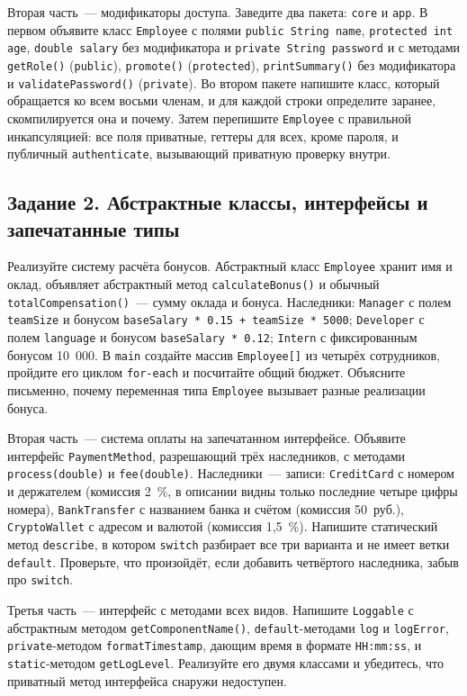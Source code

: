 Вторая часть~--- модификаторы доступа. Заведите два пакета: \texttt{core} и
\texttt{app}. В первом объявите класс \texttt{Employee} с полями
\texttt{public String name}, \texttt{protected int age},
\texttt{double salary} без модификатора и \texttt{private String password} и с
методами \texttt{getRole()} (\texttt{public}), \texttt{promote()}
(\texttt{protected}), \texttt{printSummary()} без модификатора и
\texttt{validatePassword()} (\texttt{private}). Во втором пакете напишите
класс, который обращается ко всем восьми членам, и для каждой строки
определите заранее, скомпилируется она и почему. Затем перепишите
\texttt{Employee} с правильной инкапсуляцией: все поля приватные, геттеры для
всех, кроме пароля, и публичный \texttt{authenticate}, вызывающий приватную
проверку внутри.

\subsection*{Задание 2. Абстрактные классы, интерфейсы и запечатанные типы}

Реализуйте систему расчёта бонусов. Абстрактный класс \texttt{Employee}
хранит имя и оклад, объявляет абстрактный метод \texttt{calculateBonus()} и
обычный \texttt{totalCompensation()}~--- сумму оклада и бонуса. Наследники:
\texttt{Manager} с полем \texttt{teamSize} и бонусом
\texttt{baseSalary * 0.15 + teamSize * 5000}; \texttt{Developer} с полем
\texttt{language} и бонусом \texttt{baseSalary * 0.12}; \texttt{Intern} с
фиксированным бонусом 10~000. В \texttt{main} создайте массив
\texttt{Employee[]} из четырёх сотрудников, пройдите его циклом
\texttt{for-each} и посчитайте общий бюджет. Объясните письменно, почему
переменная типа \texttt{Employee} вызывает разные реализации бонуса.

Вторая часть~--- система оплаты на запечатанном интерфейсе. Объявите
интерфейс \texttt{PaymentMethod}, разрешающий трёх наследников, с методами
\texttt{process(double)} и \texttt{fee(double)}. Наследники~--- записи:
\texttt{CreditCard} с номером и держателем (комиссия 2~\%, в описании видны
только последние четыре цифры номера), \texttt{BankTransfer} с названием
банка и счётом (комиссия 50~руб.), \texttt{CryptoWallet} с адресом и валютой
(комиссия 1,5~\%). Напишите статический метод \texttt{describe}, в котором
\texttt{switch} разбирает все три варианта и не имеет ветки
\texttt{default}. Проверьте, что произойдёт, если добавить четвёртого
наследника, забыв про \texttt{switch}.

Третья часть~--- интерфейс с методами всех видов. Напишите \texttt{Loggable} с
абстрактным методом \texttt{getComponentName()}, \texttt{default}-методами
\texttt{log} и \texttt{logError}, \texttt{private}-методом
\texttt{formatTimestamp}, дающим время в формате \texttt{HH:mm:ss}, и
\texttt{static}-методом \texttt{getLogLevel}. Реализуйте его двумя классами и
убедитесь, что приватный метод интерфейса снаружи недоступен.

